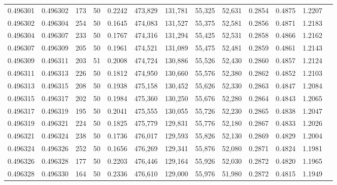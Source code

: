 \begin{tabular}{rrrrrrrrrrrrr}
0.496301 & 0.496302 &   173 &  50 &                                     0.2242 & 473,829 & 131,781 &  55,325 &  52,631 & 0.2854 & 0.4875 & 1.2207 \\
0.496302 & 0.496304 &   254 &  50 &                                     0.1645 & 474,083 & 131,527 &  55,375 &  52,581 & 0.2856 & 0.4871 & 1.2183 \\
0.496304 & 0.496307 &   233 &  50 &                                     0.1767 & 474,316 & 131,294 &  55,425 &  52,531 & 0.2858 & 0.4866 & 1.2162 \\
0.496307 & 0.496309 &   205 &  50 &                                     0.1961 & 474,521 & 131,089 &  55,475 &  52,481 & 0.2859 & 0.4861 & 1.2143 \\
0.496309 & 0.496311 &   203 &  51 &                                     0.2008 & 474,724 & 130,886 &  55,526 &  52,430 & 0.2860 & 0.4857 & 1.2124 \\
0.496311 & 0.496313 &   226 &  50 &                                     0.1812 & 474,950 & 130,660 &  55,576 &  52,380 & 0.2862 & 0.4852 & 1.2103 \\
0.496313 & 0.496315 &   208 &  50 &                                     0.1938 & 475,158 & 130,452 &  55,626 &  52,330 & 0.2863 & 0.4847 & 1.2084 \\
0.496315 & 0.496317 &   202 &  50 &                                     0.1984 & 475,360 & 130,250 &  55,676 &  52,280 & 0.2864 & 0.4843 & 1.2065 \\
0.496317 & 0.496319 &   195 &  50 &                                     0.2041 & 475,555 & 130,055 &  55,726 &  52,230 & 0.2865 & 0.4838 & 1.2047 \\
0.496319 & 0.496321 &   224 &  50 &                                     0.1825 & 475,779 & 129,831 &  55,776 &  52,180 & 0.2867 & 0.4833 & 1.2026 \\
0.496321 & 0.496324 &   238 &  50 &                                     0.1736 & 476,017 & 129,593 &  55,826 &  52,130 & 0.2869 & 0.4829 & 1.2004 \\
0.496324 & 0.496326 &   252 &  50 &                                     0.1656 & 476,269 & 129,341 &  55,876 &  52,080 & 0.2871 & 0.4824 & 1.1981 \\
0.496326 & 0.496328 &   177 &  50 &                                     0.2203 & 476,446 & 129,164 &  55,926 &  52,030 & 0.2872 & 0.4820 & 1.1965 \\
0.496328 & 0.496330 &   164 &  50 &                                     0.2336 & 476,610 & 129,000 &  55,976 &  51,980 & 0.2872 & 0.4815 & 1.1949 \\

\end{tabular}

